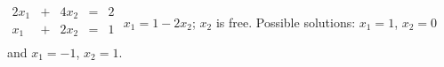 {$\begin{array}{JQJQJ}
2x_1&+&4x_2&=&2\\
x_1&+&2x_2&=&1\\
\end{array}$}
{$x_1=1-2x_2$; $x_2$ is free. Possible solutions: $x_1=1$, $x_2=0$ and $x_1=-1$, $x_2=1$.}
